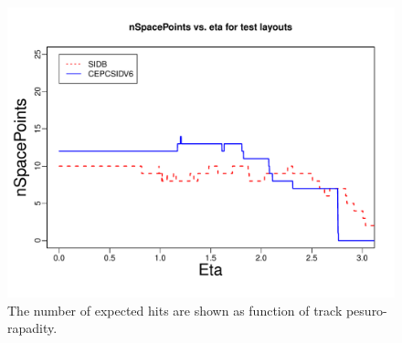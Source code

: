 \begin{figure}[hbtp]
\begin{center}
\includegraphics[width=0.45\textheight,keepaspectratio]{Figures/TrackingSystem/FullSilicon/Overlay_nHvsetaZ_R.pdf}
\caption{The number of expected hits are shown as function of track pesuro-rapadity.\label{fig:fullnhit}}
\end{center}
\end{figure}

